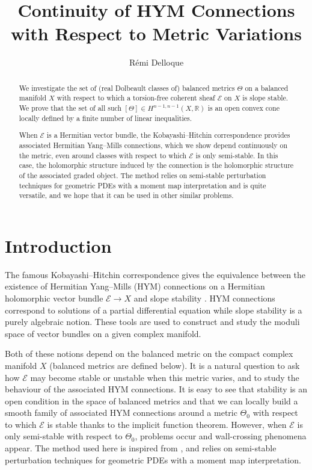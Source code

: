\documentclass{article}
\title{Continuity of HYM Connections \\ with Respect to Metric Variations}
\author{Rémi Delloque}
\date{}
\theoremstyle{remark}
\theoremstyle{definition}
\newcommand{\R}{\mathbb{R}}
\newcommand{\E}{\mathcal{E}}
\begin{document}
\maketitle
\begin{abstract}
    We investigate the set of (real Dolbeault classes of) balanced metrics $\Theta$ on a balanced manifold $X$ with respect to which a torsion-free coherent sheaf $\E$ on $X$ is slope stable. We prove that the set of all such $[\Theta] \in H^{n - 1,n - 1}(X,\R)$ is an open convex cone locally defined by a finite number of linear inequalities.
    
    When $\E$ is a Hermitian vector bundle, the Kobayashi--Hitchin correspondence provides associated Hermitian Yang--Mills connections, which we show depend continuously on the metric, even around classes with respect to which $\mathcal{E}$ is only semi-stable. In this case, the holomorphic structure induced by the connection is the holomorphic structure of the associated graded object. The method relies on semi-stable perturbation techniques for geometric PDEs with a moment map interpretation and is quite versatile, and we hope that it can be used in other similar problems.
\end{abstract}

\section{Introduction}

The famous Kobayashi--Hitchin correspondence \cite{KH1,KH2,Donaldson,Uhlenbeck_Yau} gives the equivalence between the existence of Hermitian Yang--Mills (HYM) connections on a Hermitian holomorphic vector bundle $\E \rightarrow X$ and slope stability \cite{Mumford,Takemoto}. HYM connections correspond to solutions of a partial differential equation while slope stability is a purely algebraic notion. These tools are used to construct and study the moduli space of vector bundles on a given complex manifold.

Both of these notions depend on the balanced metric on the compact complex manifold $X$ (balanced metrics are defined below). It is a natural question to ask how $\E$ may become stable or unstable when this metric varies, and to study the behaviour of the associated HYM connections. It is easy to see that stability is an open condition in the space of balanced metrics and that we can locally build a smooth family of associated HYM connections around a metric $\Theta_0$ with respect to which $\E$ is stable thanks to the implicit function theorem. However, when $\E$ is only semi-stable with respect to $\Theta_0$, problems occur and wall-crossing phenomena appear. The method used here is inspired from \cite{Gabor,DMS,Clarke_Tipler}, and relies on semi-stable perturbation techniques for geometric PDEs with a moment map interpretation.
\end{document}
